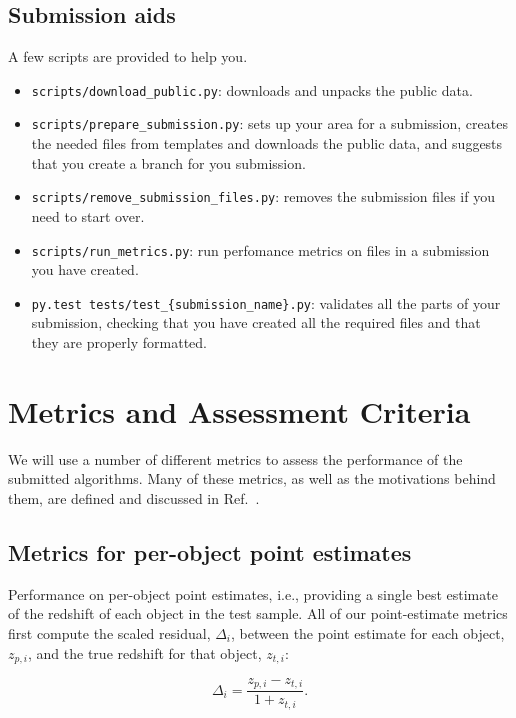 \documentclass[11pt,twoside,letterpaper,onecolumn,english]{article}
\begin{document}
\subsection{Submission aids}

A few scripts are provided to help you.

\begin{itemize}
  \item{\texttt{scripts/download\_public.py}:  downloads and unpacks
      the public data.}    
  \item{\texttt{scripts/prepare\_submission.py}:  sets up your area for
      a submission, creates the needed files from templates and
      downloads the public data, and suggests that you create a branch
      for you submission.}
  \item{\texttt{scripts/remove\_submission\_files.py}:  removes the
      submission files if you need to start over.}
  \item{\texttt{scripts/run\_metrics.py}:  run perfomance metrics on
      files in a submission you have created.}    
  \item{\texttt{py.test tests/test\_\{submission\_name\}.py}:  validates
      all the parts of your submission, checking that you have created
      all the required files and that they are properly formatted.}
\end{itemize}
      

\section{Metrics and Assessment Criteria}
\label{sec:metrics}

We will use a number of different metrics to assess the performance of
the submitted algorithms. Many of these metrics, as well as the
motivations behind them, are defined and discussed in
Ref.~\cite{therailteam2025}.

\subsection{Metrics for per-object point estimates}

Performance on per-object point estimates, i.e., providing a single
best estimate of the redshift of each object in the test sample. All
of our point-estimate metrics first compute the scaled residual,
$\Delta_i$, between the point estimate for each object, $z_{p,i}$, and
the true redshift for that object, $z_{t,i}$:

\begin{equation}
    \Delta_i = \frac{z_{p,i}-z_{t,i}}{1+z_{t,i}}.
\end{equation}
\end{document}
